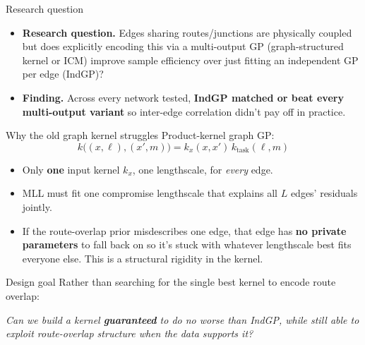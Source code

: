 \documentclass[11pt]{beamer}
\begin{document}
\begin{frame}{Research question}
    \begin{itemize}
        \item \textbf{Research question.} Edges sharing routes/junctions are
    physically coupled but does explicitly encoding this via a
    multi-output GP (graph-structured kernel or ICM) improve sample
    efficiency over just fitting an independent GP per edge (IndGP)?
    \item \textbf{Finding.} Across every network tested,
    \textbf{IndGP matched or beat every multi-output variant} so
    inter-edge correlation didn't pay off in practice.
    \end{itemize}

\end{frame}
\begin{frame}{Why the old graph kernel struggles}
Product-kernel graph GP:
\[
    k\bigl((x,\ell),(x',m)\bigr) = k_x(x,x')\,k_{\mathrm{task}}(\ell,m)
\]
\begin{itemize}
    \item Only \textbf{one} input kernel $k_x$, one lengthscale, for
    \emph{every} edge. 
    \item MLL must fit one compromise lengthscale that explains all $L$
    edges' residuals jointly.
    \item If the route-overlap prior misdescribes one edge, that edge has
    \textbf{no private parameters} to fall back on so it's stuck with
    whatever lengthscale best fits everyone else. This is a structural rigidity in the kernel. 
\end{itemize}

\end{frame}

\begin{frame}{Design goal}
Rather than searching for the single best kernel to encode route overlap:
\begin{center}
\Large
\emph{Can we build a kernel \textbf{guaranteed} to do no worse than
IndGP, while still able to exploit route-overlap structure when the data
supports it?}
\end{center}

\end{frame}
\end{document}
